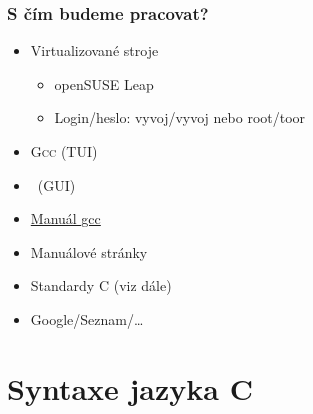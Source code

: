 \begin{frame}
  \frametitle{S čím budeme pracovat?}

  \begin{itemize}
    \item Virtualizované stroje
    \begin{itemize}
      \item openSUSE Leap
      \item Login/heslo: vyvoj/vyvoj nebo root/toor
    \end{itemize}
  \end{itemize}

  \pause
  \medskip

  \begin{itemize}
    \item \textsc{Gcc} (TUI)
    \item \qtc\ (GUI)
  \end{itemize}

  \pause
  \medskip

  \begin{itemize}
    \item \href{https://gcc.gnu.org/onlinedocs/}{Manuál gcc}
    \item Manuálové stránky
    \item Standardy C (viz dále)

    \pause

    \item Google/Seznam/\dots
  \end{itemize}

\end{frame}

\section{Syntaxe jazyka C}
\frame{\sectionpage}

